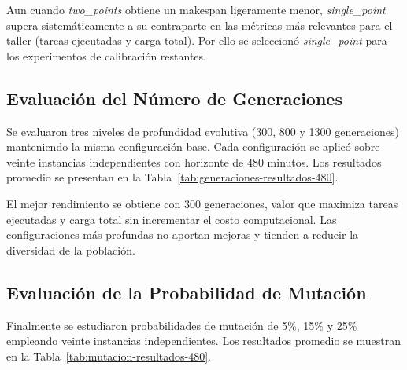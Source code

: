 Aun cuando \textit{two\_points} obtiene un makespan ligeramente menor, \textit{single\_point} supera sistemáticamente a su contraparte en las métricas más relevantes para el taller (tareas ejecutadas y carga total). Por ello se seleccionó \textit{single\_point} para los experimentos de calibración restantes.

\subsection{Evaluación del Número de Generaciones}
\label{subsec:generaciones}

Se evaluaron tres niveles de profundidad evolutiva (300, 800 y 1300 generaciones) manteniendo la misma configuración base. Cada configuración se aplicó sobre veinte instancias independientes con horizonte de 480 minutos. Los resultados promedio se presentan en la Tabla~\ref{tab:generaciones-resultados-480}.

\begin{table}[htbp]
\centering
\small
\caption{Resultados promedio del AG para distintos números de generaciones (480 minutos).}
\label{tab:generaciones-resultados-480}
\end{table}

El mejor rendimiento se obtiene con 300 generaciones, valor que maximiza tareas ejecutadas y carga total sin incrementar el costo computacional. Las configuraciones más profundas no aportan mejoras y tienden a reducir la diversidad de la población.

\subsection{Evaluación de la Probabilidad de Mutación}
\label{subsec:mutacion}

Finalmente se estudiaron probabilidades de mutación de 5\%, 15\% y 25\% empleando veinte instancias independientes. Los resultados promedio se muestran en la Tabla~\ref{tab:mutacion-resultados-480}.

